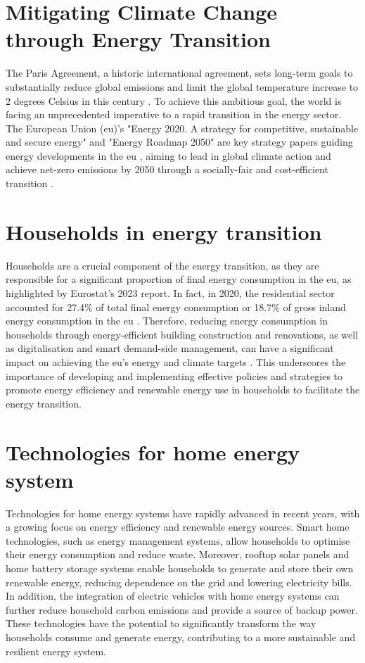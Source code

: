 \section{Mitigating Climate Change through Energy Transition}
The Paris Agreement, a historic international agreement, sets long-term goals to substantially reduce global emissions and limit the global temperature increase to 2 degrees Celsius in this century \cite{paris}.
To achieve this ambitious goal, the world is facing an unprecedented imperative to a rapid transition in the energy sector. 
The European Union (\gls{eu})'s "Energy 2020. A strategy for competitive, sustainable and secure energy" and "Energy Roadmap 2050" are key strategy papers guiding energy developments in the \gls{eu} \cite{roadmap}, aiming to lead in global climate action and achieve net-zero emissions by 2050 through a socially-fair and cost-efficient transition \cite{clean}. 


\section{Households in energy transition}

Households are a crucial component of the energy transition, as they are responsible for a significant proportion of final energy consumption in the \gls{eu}, as highlighted by Eurostat's 2023 report. 
In fact, in 2020, the residential sector accounted for 27.4\% of total final energy consumption or 18.7\% of gross inland energy consumption in the \gls{eu} \cite{eurostat}. 
Therefore, reducing energy consumption in households through energy-efficient building construction and renovations, as well as digitalisation and smart demand-side management, can have a significant impact on achieving the \gls{eu}'s energy and climate targets \cite{building}. 
This underscores the importance of developing and implementing effective policies and strategies to promote energy efficiency and renewable energy use in households to facilitate the energy transition.


\section{Technologies for home energy system}

Technologies for home energy systems have rapidly advanced in recent years, with a growing focus on energy efficiency and renewable energy sources. 
Smart home technologies, such as energy management systems, allow households to optimise their energy consumption and reduce waste. 
Moreover, rooftop solar panels and home battery storage systems enable households to generate and store their own renewable energy, reducing dependence on the grid and lowering electricity bills. 
In addition, the integration of electric vehicles with home energy systems can further reduce household carbon emissions and provide a source of backup power. 
These technologies have the potential to significantly transform the way households consume and generate energy, contributing to a more sustainable and resilient energy system.


